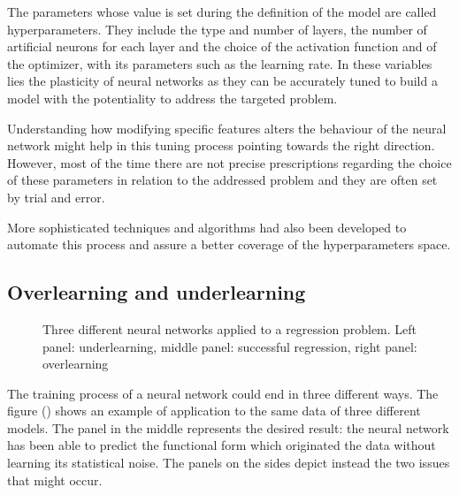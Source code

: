 \documentclass[a4paper,10pt]{report}
\begin{document}
The parameters whose value is set during the definition of the model are called hyperparameters.
They include the type and number of layers, the number of artificial neurons for each layer and
the choice of the activation function and of the optimizer, with
its parameters such as the learning rate. In these variables lies the plasticity of neural networks as
they can be accurately tuned to build a model with the potentiality 
to address the targeted problem.

Understanding how modifying specific features alters the behaviour of the neural 
network might help in this tuning process pointing towards the right direction.
However, most of the time there are not precise prescriptions regarding the choice of these parameters
in relation to the addressed problem and they are often set by trial and error.

More sophisticated techniques and algorithms had also been developed to automate this process and 
assure a better coverage of the hyperparameters space.

\subsection{Overlearning and underlearning}

\begin{figure}
    \begin{center}
        
    \end{center}
    \caption{Three different neural networks applied to a regression problem.
    Left panel: underlearning, middle panel: successful regression, right panel: overlearning}
\end{figure}

The training process of a neural network could end in three different ways.
The figure () shows an example of application to the same data of three different models.
The panel in the middle represents the desired result: the neural network has been able to predict the 
functional form which originated the data without learning its statistical noise.
The panels on the sides depict instead the two issues that might occur.
\end{document}
